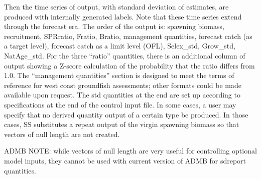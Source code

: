 Then the time series of output, with standard deviation of estimates, are produced with internally generated labels.  Note that these time series extend through the forecast era.  The order of the output is:  spawning biomass, recruitment, SPRratio, Fratio, Bratio, management quantities, forecast catch (as a target level), forecast catch as a limit level (OFL), Selex\_std, Grow\_std, NatAge\_std.  For the three “ratio” quantities, there is an additional column of output showing a Z-score calculation of the probability that the ratio differs from 1.0.  The “management quantities” section is designed to meet the terms of reference for west coast groundfish assessments; other formats could be made available upon request.  The std quantities at the end are set up according to specifications at the end of the control input file.  In some cases, a user may specify that no derived quantity output of a certain type be produced.  In those cases, SS substitutes a repeat output of the virgin spawning biomass so that vectors of null length are not created.

ADMB NOTE:  while vectors of null length are very useful for controlling optional model inputs, they cannot be used with current version of ADMB for sdreport quantities.

